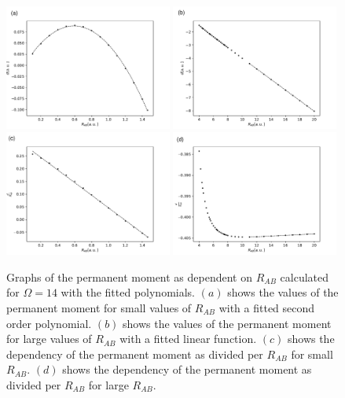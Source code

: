 \documentclass{pracalicmgr}
\begin{document}
\begin{figure}[H]
    \center
    \includegraphics[width=0.49\textwidth]{14D_partial.pdf}
    \includegraphics[width=0.49\textwidth]{14_partial2.pdf}
    \includegraphics[width=0.49\textwidth]{14_partial_uno.pdf}
    \includegraphics[width=0.49\textwidth]{14_partial2_uno.pdf}
    \caption{Graphs of the permanent moment as dependent on $R_{AB}$ calculated for $\Omega = 14$ with the fitted polynomials. $(a)$ shows the values of the permanent moment for small values of $R_{AB}$ with a fitted second order polynomial. $(b)$ shows the values of the permanent moment for large values of $R_{AB}$ with a fitted linear function. $(c)$ shows the dependency of the permanent moment as divided per $R_{AB}$ for small $R_{AB}$. $(d)$ shows the dependency of the permanent moment as divided per $R_{AB}$ for large $R_{AB}$. }
    \label{D partial}
\end{figure}
\end{document}
